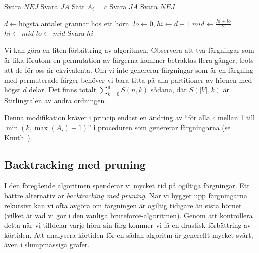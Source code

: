 \documentclass[a4paper]{report}
\begin{document}
\clearpage

\begin{algorithmic}[1]
                    \State Svara $NEJ$
                \EndIf
            \EndFor
            \State Svara $JA$
        \EndIf
            \State Sätt $A_i = c$
                \State Svara $JA$
            \EndIf
        \EndFor
        \State Svara $NEJ$
    \EndProcedure

        \State $d \gets $högsta antalet grannar hos ett hörn.
        \State $lo \gets 0, hi \gets d+1$
            \State $mid \gets \frac{hi + lo}{2}$
                \State $hi \gets mid$
            \Else
                \State $lo \gets mid$
            \EndIf
        \EndWhile
        \State Svara $hi$
    \EndProcedure
\end{algorithmic}

Vi kan göra en liten förbättring av algoritmen. Observera att två färgningar som är lika förutom en permutation av färgerna kommer betraktas flera gånger, trots att de för oss är ekvivalenta. Om vi inte genererar färgningar som är en färgning med permuterade färger behöver vi bara titta på alla partitioner av hörnen med högst $d$ delar. Det finns totalt $\sum_{k=0}^d{S(n, k)}$ sådana, där $S(|V|, k)$ är Stirlingtalen av andra ordningen.

Denna modifikation kräver i princip endast en ändring av ``för alla $c$ mellan 1 till $\min(k, \max(A_i) + 1)$'' i proceduren som genererar färgningarna (se Knuth~\cite{Knuth4a:1997}).

\subsection{Backtracking med pruning}
I den föregående algoritmen spenderar vi mycket tid på ogiltiga färgningar. Ett bättre alternativ är \emph{backtracking med pruning}. När vi bygger upp färgningarna rekursivt kan vi ofta avgöra om färgningen är ogiltig tidigare än sista hörnet (vilket är vad vi gör i den vanliga bruteforce-algoritmen).
Genom att kontrollera detta när vi tilldelar varje hörn sin färg kommer vi få en drastisk förbättring av körtiden. Att analysera körtiden för en sådan algoritm är generellt mycket svårt, även i slumpmässiga grafer.
\end{document}
